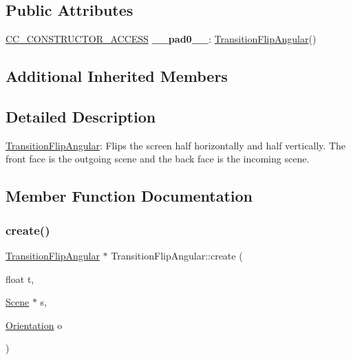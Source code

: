 \subsection*{Public Attributes}
\begin{DoxyCompactItemize}
\item 
\mbox{\label{classTransitionFlipAngular_a382c1ad2af9cc2980b0f80307d281179}} 
\hyperlink{_2cocos2d_2cocos_2base_2ccConfig_8h_a25ef1314f97c35a2ed3d029b0ead6da0}{C\+C\+\_\+\+C\+O\+N\+S\+T\+R\+U\+C\+T\+O\+R\+\_\+\+A\+C\+C\+E\+SS} {\bfseries \+\_\+\+\_\+pad0\+\_\+\+\_\+}\+: \hyperlink{classTransitionFlipAngular}{Transition\+Flip\+Angular}()
\end{DoxyCompactItemize}
\subsection*{Additional Inherited Members}


\subsection{Detailed Description}
\hyperlink{classTransitionFlipAngular}{Transition\+Flip\+Angular}\+: Flips the screen half horizontally and half vertically. The front face is the outgoing scene and the back face is the incoming scene. 

\subsection{Member Function Documentation}
\mbox{\label{classTransitionFlipAngular_a3b28f30b5abcededf90c769e05f38b82}} 
\subsubsection{\texorpdfstring{create()}{create()}\hspace{0.1cm}{\footnotesize\ttfamily [1/4]}}
{\footnotesize\ttfamily \hyperlink{classTransitionFlipAngular}{Transition\+Flip\+Angular} $\ast$ Transition\+Flip\+Angular\+::create (\begin{DoxyParamCaption}\item[{float}]{t,  }\item[{\hyperlink{classScene}{Scene} $\ast$}]{s,  }\item[{\hyperlink{classTransitionScene_a0b2b247806fb10a20de0cbc554210c4d}{Orientation}}]{o }\end{DoxyParamCaption})\hspace{0.3cm}{\ttfamily [static]}}

